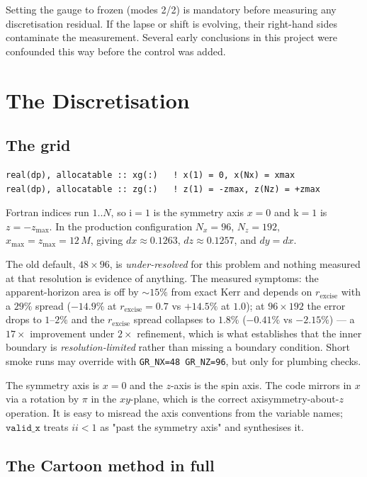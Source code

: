 \documentclass[11pt,openany]{book}
\begin{document}
\gotcha
Setting the gauge to frozen (modes 2/2) is mandatory before measuring any
discretisation residual. If the lapse or shift is evolving, their right-hand
sides contaminate the measurement. Several early conclusions in this project
were confounded this way before the control was added.

\chapter{The Discretisation}
\label{ch:disc}

\section{The grid}

\begin{lstlisting}
real(dp), allocatable :: xg(:)   ! x(1) = 0, x(Nx) = xmax
real(dp), allocatable :: zg(:)   ! z(1) = -zmax, z(Nz) = +zmax
\end{lstlisting}

Fortran indices run $1..N$, so $\mathrm{i}=1$ is the symmetry axis $x=0$ and
$\mathrm{k}=1$ is $z=-z_{\max}$. In the production configuration
$N_x = 96$, $N_z = 192$, $x_{\max} = z_{\max} = 12\,M$, giving
$dx \approx 0.1263$, $dz \approx 0.1257$, and $dy = dx$.

\gotcha
The old default, $48\times96$, is \emph{under-resolved} for this problem and
nothing measured at that resolution is evidence of anything. The measured
symptoms: the apparent-horizon area is off by $\sim15\%$ from exact Kerr and
depends on $r_{\mathrm{excise}}$ with a $29\%$ spread ($-14.9\%$ at
$r_{\mathrm{excise}} = 0.7$ vs $+14.5\%$ at $1.0$); at $96\times192$ the
error drops to $1$--$2\%$ and the $r_{\mathrm{excise}}$ spread collapses to
$1.8\%$ ($-0.41\%$ vs $-2.15\%$) --- a $17\times$ improvement under $2\times$
refinement, which is what establishes that the inner boundary is
\emph{resolution-limited} rather than missing a boundary condition. Short
smoke runs may override with \texttt{GR\_NX=48 GR\_NZ=96}, but only for
plumbing checks.

\gotcha
The symmetry axis is $x=0$ and the $z$-axis is the spin axis. The code mirrors
in $x$ via a rotation by $\pi$ in the $xy$-plane, which is the correct
axisymmetry-about-$z$ operation. It is easy to misread the axis conventions
from the variable names; $\texttt{valid\_x}$ treats $ii < 1$ as "past the
symmetry axis" and synthesises it.

\section{The Cartoon method in full}
\end{document}
